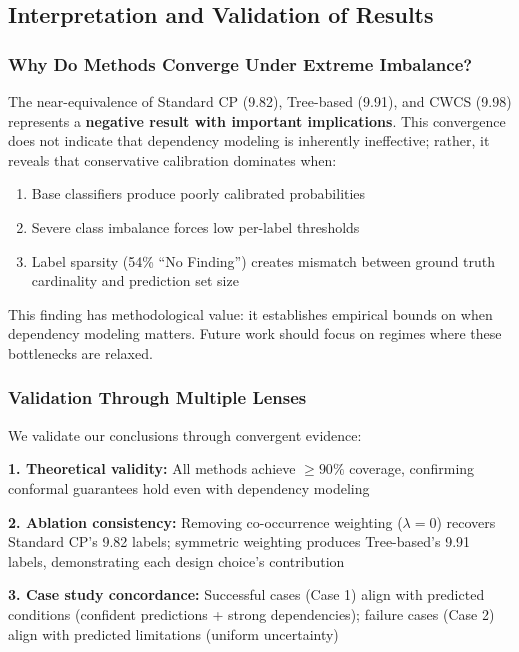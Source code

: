 \subsection{Interpretation and Validation of Results}

\subsubsection{Why Do Methods Converge Under Extreme Imbalance?}

The near-equivalence of Standard CP (9.82), Tree-based (9.91), and CWCS (9.98) represents a \textbf{negative result with important implications}. This convergence does not indicate that dependency modeling is inherently ineffective; rather, it reveals that conservative calibration dominates when:

\begin{enumerate}
    \item Base classifiers produce poorly calibrated probabilities
    \item Severe class imbalance forces low per-label thresholds
    \item Label sparsity (54\% ``No Finding'') creates mismatch between ground truth cardinality and prediction set size
\end{enumerate}

This finding has methodological value: it establishes empirical bounds on when dependency modeling matters. Future work should focus on regimes where these bottlenecks are relaxed.

\subsubsection{Validation Through Multiple Lenses}

We validate our conclusions through convergent evidence:

\textbf{1. Theoretical validity:} All methods achieve $\geq 90\%$ coverage, confirming conformal guarantees hold even with dependency modeling

\textbf{2. Ablation consistency:} Removing co-occurrence weighting ($\lambda=0$) recovers Standard CP's 9.82 labels; symmetric weighting produces Tree-based's 9.91 labels, demonstrating each design choice's contribution

\textbf{3. Case study concordance:} Successful cases (Case 1) align with predicted conditions (confident predictions + strong dependencies); failure cases (Case 2) align with predicted limitations (uniform uncertainty)

